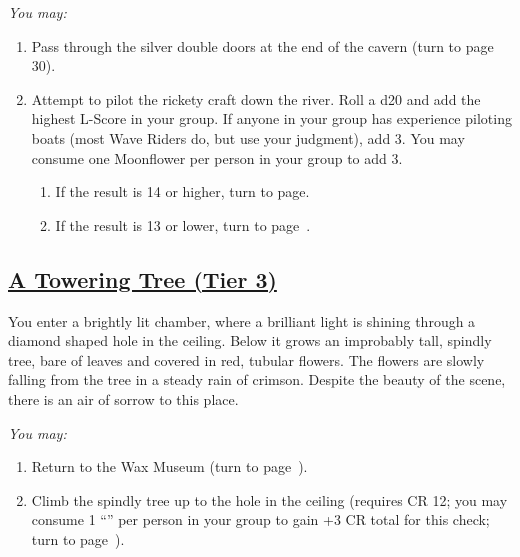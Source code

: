 \documentclass[sheet]{GL2020}
\begin{document}
\vspace{0.5cm}

\begingroup
\itshape
You may:
\begin{enumerate}[A]
  \item Pass through the silver double doors at the end of the cavern (turn to page 30).
	\item Attempt to pilot the rickety craft down the river. Roll a d20 and add the highest L-Score in your group. If anyone in your group has experience piloting boats (most Wave Riders do, but use your judgment), add 3. You may consume one Moonflower per person in your group to add 3.
	\begin{enumerate}
		\item If the result is 14 or higher, turn to page\pageref{ChamberofRelics}.
		\item If the result is 13 or lower, turn to page~\pageref{WetandBumpyRide}.
	\end{enumerate}
\end{enumerate}
\endgroup

\clearpage

\begin{center}\section*{\underline{A Towering Tree (Tier 3)}}\end{center}
\label{ToweringTree}

You enter a brightly lit chamber, where a brilliant light is shining through a diamond shaped hole in the ceiling. Below it grows an improbably tall, spindly tree, bare of leaves and covered in red, tubular flowers. The flowers are slowly falling from the tree in a steady rain of crimson. Despite the beauty of the scene, there is an air of sorrow to this place.

\vspace{0.5cm}

\begingroup
\itshape
You may:
\begin{enumerate}[A]
  \item Return to the Wax Museum (turn to page~\pageref{WaxMuseum}).
	\item Climb the spindly tree up to the hole in the ceiling (requires CR 12; you may consume 1 ``\iSunflower{}'' per person in your group to gain +3 CR total for this check; turn to page~\pageref{LightedPedestal}).
\end{enumerate}
\endgroup

\clearpage
\end{document}
